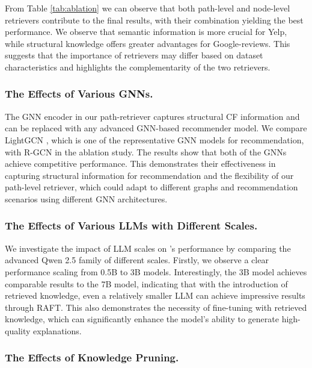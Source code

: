 From Table \ref{tab:ablation} we can observe that both path-level and node-level retrievers contribute to the final results, with their combination yielding the best performance. We observe that semantic information is more crucial for Yelp, while structural knowledge offers greater advantages for Google-reviews. This suggests that the importance of retrievers may differ based on dataset characteristics and highlights the complementarity of the two retrievers. 



\subsubsection{The Effects of Various GNNs.}

The GNN encoder in our path-retriever captures structural CF information and can be replaced with any advanced GNN-based recommender model. We compare LightGCN \cite{he2020lightgcn}, which is one of the representative GNN models for recommendation, with R-GCN \cite{schlichtkrull2018modeling} in the ablation study. The results show that both of the GNNs achieve competitive performance. This demonstrates their effectiveness in capturing structural information for recommendation and the flexibility of our path-level retriever, which could adapt to different graphs and recommendation scenarios using different GNN architectures.

\subsubsection{The Effects of Various LLMs with Different Scales.} 

We investigate the impact of LLM scales on \model's performance by comparing the advanced Qwen 2.5 family \cite{yang2024qwen2} of different scales. Firstly, we observe a clear performance scaling from 0.5B to 3B models. Interestingly, the 3B model achieves comparable results to the 7B model, indicating that with the introduction of retrieved knowledge, even a relatively smaller LLM can achieve impressive results through RAFT. This also demonstrates the necessity of fine-tuning with retrieved knowledge, which can significantly enhance the model's ability to generate high-quality explanations.


\subsubsection{The Effects of Knowledge Pruning.}

